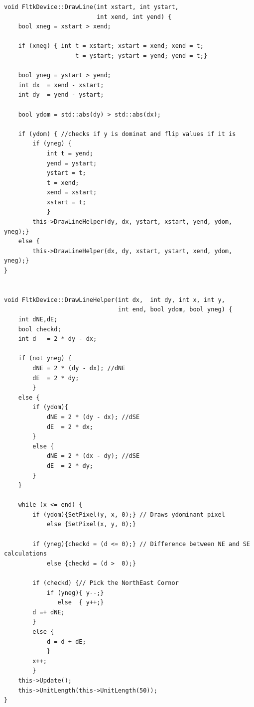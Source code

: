 \documentclass{article}
\begin{document}
\begin{verbatim}
void FltkDevice::DrawLine(int xstart, int ystart, 
                          int xend, int yend) {
    bool xneg = xstart > xend;

    if (xneg) { int t = xstart; xstart = xend; xend = t;
                    t = ystart; ystart = yend; yend = t;}

    bool yneg = ystart > yend;
    int dx  = xend - xstart;
    int dy  = yend - ystart;

    bool ydom = std::abs(dy) > std::abs(dx);
     
    if (ydom) { //checks if y is dominat and flip values if it is
        if (yneg) {
            int t = yend;
            yend = ystart;
            ystart = t;
            t = xend;
            xend = xstart;
            xstart = t;
            }
        this->DrawLineHelper(dy, dx, ystart, xstart, yend, ydom, yneg);}
    else {
        this->DrawLineHelper(dx, dy, xstart, ystart, xend, ydom, yneg);}
}


void FltkDevice::DrawLineHelper(int dx,  int dy, int x, int y, 
                                int end, bool ydom, bool yneg) {
    int dNE,dE;
    bool checkd;
    int d   = 2 * dy - dx;

    if (not yneg) {
        dNE = 2 * (dy - dx); //dNE
        dE  = 2 * dy;
        }
    else {
        if (ydom){
            dNE = 2 * (dy - dx); //dSE
            dE  = 2 * dx;
        }
        else {
            dNE = 2 * (dx - dy); //dSE
            dE  = 2 * dy;
        }
    }

    while (x <= end) {
        if (ydom){SetPixel(y, x, 0);} // Draws ydominant pixel
            else {SetPixel(x, y, 0);}

        if (yneg){checkd = (d <= 0);} // Difference between NE and SE calculations
            else {checkd = (d >  0);}

        if (checkd) {// Pick the NorthEast Cornor
            if (yneg){ y--;}
               else  { y++;}
        d =+ dNE;
        }
        else {
            d = d + dE;
            }
        x++;
        }
    this->Update();
    this->UnitLength(this->UnitLength(50));
}
\end{verbatim}
\end{document}
